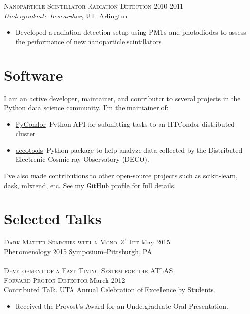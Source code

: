 \documentclass[line,margin]{res}
\begin{document}
\begin{resume}
	\textsc{Nanoparticle Scintillator Radiation Detection} \hfill 2010-2011 \\
	{\it Undergraduate Researcher}, UT--Arlington
		\begin{itemize}
		\item Developed a radiation detection setup using PMTs and photodiodes to assess the performance of new nanoparticle scintillators.
		\end{itemize}

\section{\sc Software}

	I am an active developer, maintainer, and contributor to several projects in the Python data science community. I'm the maintainer of:
	\begin{itemize}
		\item \href{https://github.com/jrbourbeau/pycondor}{PyCondor}--Python API for submitting tasks to an HTCondor distributed cluster.
		\item \href{https://github.com/WIPACRepo/decotools}{decotools}--Python package to help analyze data collected by the Distributed Electronic Cosmic-ray Observatory (DECO).
	\end{itemize}

	I've also made contributions to other open-source projects such as scikit-learn, dask, mlxtend, etc. See my \href{https://github.com/jrbourbeau}{GitHub profile} for full details.


\section{\sc Selected Talks}
		\textsc{Dark Matter Searches with a Mono-$Z'$ Jet} \hfill May 2015\\
		Phenomenology 2015 Symposium--Pittsburgh, PA\\ \\
		\textsc{Development of a Fast Timing System for the ATLAS \\ Forward Proton Detector} \hfill March 2012\\
		Contributed Talk. UTA Annual Celebration of Excellence by Students.
		  \begin{itemize}
                     \item Received the Provost's Award for an Undergraduate Oral Presentation.
                     \end{itemize}



\end{resume}
\end{document}
